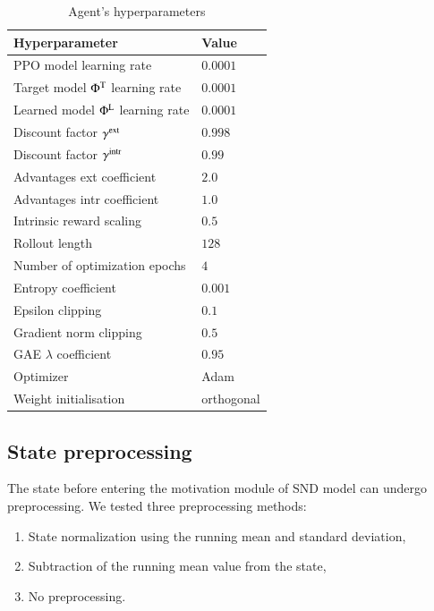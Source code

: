 \documentclass[a4paper,11pt]{elsarticle}
\begin{document}
\begin{table}[thb]
\scriptsize
\centering
\caption{Agent's hyperparameters}
    \begin{tabular}{l|l}
        Hyperparameter & Value \\ 
        \hline\hline
        PPO model learning rate & $0.0001$ \\
        Target model $\Phi^{\rm T}$ learning rate & $0.0001$ \\
        Learned model $\Phi^{\rm L}$ learning rate & $0.0001$ \\
        Discount factor $\gamma^{\rm ext}$ & $0.998$ \\
        Discount factor $\gamma^{\rm intr}$ & $0.99$ \\
        Advantages ext coefficient & $2.0$ \\
        Advantages intr coefficient & $1.0$ \\
        Intrinsic reward scaling & $0.5$ \\
        Rollout length & $128$ \\ 
        Number of optimization epochs & $4$ \\
        Entropy coefficient & $0.001$ \\
        Epsilon clipping & $0.1$ \\
        Gradient norm clipping & $0.5$ \\
        GAE $\lambda$ coefficient & $0.95$ \\
        Optimizer & Adam \\
        Weight initialisation & orthogonal \\
        \hline
    \end{tabular}
    \label{tab:agent_hyperparameters}
\end{table}

\subsection{State preprocessing}
\label{sec:exp2}

The state before entering the motivation module of SND model can undergo preprocessing. We tested three preprocessing methods:
\begin{enumerate}
\item State normalization using the running mean and standard deviation, 
\item Subtraction of the running mean value from the state, 
\item No preprocessing.
\end{enumerate}
\end{document}

